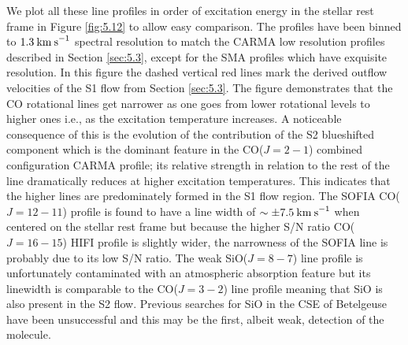 We plot all these line profiles in order of excitation energy in the stellar rest frame in Figure \ref{fig:5.12} to allow easy comparison. The profiles have been binned to $1.3\>{\rm km\>s}^{-1}$ spectral resolution to match the CARMA low resolution profiles described in Section \ref{sec:5.3}, except for the SMA profiles which have exquisite resolution. In this figure the dashed vertical red lines mark the derived outflow velocities of the S1 flow from Section \ref{sec:5.3}. The figure demonstrates  that the CO rotational lines get narrower as one goes from lower rotational levels to higher ones i.e., as the excitation temperature increases. A noticeable consequence of this is the evolution of the contribution of the S2 blueshifted component which is the dominant feature in the CO($J=2-1$) combined configuration CARMA profile; its relative strength in relation to the rest of the line dramatically reduces at higher excitation temperatures. This indicates that the higher lines are predominately formed in the S1 flow region. The SOFIA CO($\textit{J} = 12-11$) profile is found to have a line width of $\sim \pm 7.5\>{\rm km\>s}^{-1}$ when centered on the stellar rest frame but because the higher S/N ratio CO($J=16-15$) HIFI profile is slightly wider, the narrowness of the SOFIA line is probably due to its low S/N ratio. The weak SiO($J=8-7$) line profile is unfortunately contaminated with an atmospheric absorption feature but its linewidth is comparable to the CO($J=3-2$) line profile meaning that SiO is also present in the S2 flow. Previous searches for SiO in the CSE of Betelgeuse have been unsuccessful \cite[e.g.,][]{lambert_1978} and this may be the first, albeit weak, detection of the molecule. 

